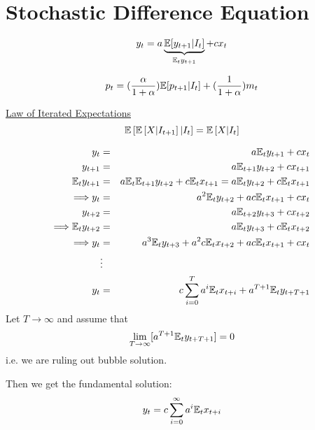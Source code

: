 \documentclass[twoside]{article}
\newcommand\lsb{\left [}
\newcommand\rsb{\right ]}
\begin{document}
\section{Stochastic Difference Equation}
\begin{equation}
    y_{t} = a \underbrace{\mathbb{E} [y_{t+1} | I_{t}]}_{\mathbb{E}_{t} y_{t+1}} + c x_{t}
\end{equation}
\begin{example}
    \begin{equation}
        p_{t} = (\frac{\alpha}{1+ \alpha}) \mathbb{E} [p_{t+1}| I_{t}]+     (\frac{1}{1+ \alpha})m_{t}
    \end{equation}
\end{example}

\underline{Law of Iterated Expectations}
\begin{equation}
    \E \lsb \E \lsb X | I_{t+1} \rsb | I_t \rsb = \E \lsb X| I_{t} \rsb
\end{equation}

\begin{eqnarray}
    y_{t} &=& a \mathbb{E}_{t}y_{t+1} + c x_{t}\\
    y_{t+1} &=& a \mathbb{E}_{t+1}y_{t+2} + c x_{t+1}\\
    \mathbb{E}_{t} y_{t+1} &=& a \mathbb{E}_{t} \mathbb{E}_{t+1}y_{t+2} + c \mathbb{E}_{t} x_{t+1} = a \mathbb{E}_{t} y_{t+2} + c \mathbb{E}_{t} x_{t+1} \\
    \Longrightarrow 
    y_{t} &=& a^{2} \mathbb{E}_{t} y_{t+2} + a c \mathbb{E}_{t} x_{t+1} + c x_{t}\\
    y_{t+2} &=& a \mathbb{E}_{t+2}y_{t+3} + c x_{t+2}\\
    \Longrightarrow 
    \mathbb{E}_{t} y_{t+2} &=& a \mathbb{E}_{t}y_{t+3} + c \mathbb{E}_{t} x_{t+2}\\
    \Longrightarrow 
    y_{t} &=& a^{3} \mathbb{E}_{t} y_{t+3} + a^2 c \mathbb{E}_{t} x_{t+2} + a c \mathbb{E}_{t} x_{t+1} + c x_{t}\\
    &\vdots& \notag\\
    y_{t} &=& c \sum_{i=0}^{T} a^{i}\mathbb{E}_{t}x_{t+i} + a^{T+1} \mathbb{E}_{t} y_{t+T+1}
\end{eqnarray}
Let $T \to \infty$ and assume that \begin{equation}
    \lim_{T \to \infty} [a^{T+1} \mathbb{E}_{t}y_{t+T+1}] = 0
\end{equation}
i.e. we are ruling out  bubble solution.

Then we get the fundamental solution:
\begin{equation}
    y_{t} = c \sum_{i=0}^{\infty} a^{i} \mathbb{E}_{t} x_{t+i}
\end{equation}
\end{document}
